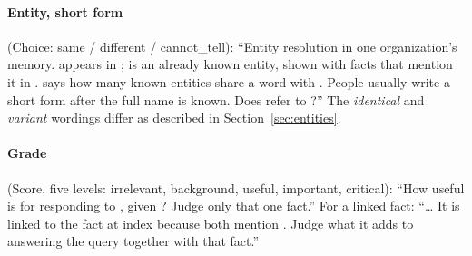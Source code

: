 \paragraph{Entity, short form} (Choice: same / different / cannot\_tell): ``Entity resolution in one organization's
memory.  appears in ;  is an already known entity,
shown with facts that mention it in .  says how many known entities share a
word with . People usually write a short form after the full name is known. Does  refer to ?''
The \emph{identical} and \emph{variant} wordings differ as described in Section~\ref{sec:entities}.

\paragraph{Grade} (Score, five levels: irrelevant, background, useful, important, critical): ``How useful is
 for responding to , given ? Judge only that
one fact.'' For a linked fact: ``\dots{} It is linked to the fact at index 
because both mention . Judge what it adds to answering the query together with that
fact.''
